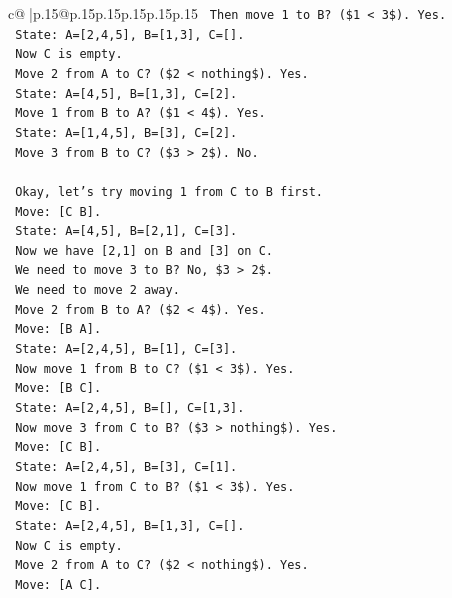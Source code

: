 \documentclass{article}
\begin{document}
{\begin{supertabular}{c@{$\;$}|p{.15\linewidth}@{}p{.15\linewidth}p{.15\linewidth}p{.15\linewidth}p{.15\linewidth}p{.15\linewidth}}
{{{\texttt{   Then move 1 to B? (\$1 < 3\$). Yes.} \\
\texttt{   State: A={[}2,4,5{]}, B={[}1,3{]}, C={[}{]}.} \\
\texttt{   Now C is empty.} \\
\texttt{   Move 2 from A to C? (\$2 < nothing\$). Yes.} \\
\texttt{   State: A={[}4,5{]}, B={[}1,3{]}, C={[}2{]}.} \\
\texttt{   Move 1 from B to A? (\$1 < 4\$). Yes.} \\
\texttt{   State: A={[}1,4,5{]}, B={[}3{]}, C={[}2{]}.} \\
\texttt{   Move 3 from B to C? (\$3 > 2\$). No.} \\
\\ 
\texttt{   Okay, let's try moving 1 from C to B first.} \\
\texttt{   Move: {[}C B{]}.} \\
\texttt{   State: A={[}4,5{]}, B={[}2,1{]}, C={[}3{]}.} \\
\texttt{   Now we have {[}2,1{]} on B and {[}3{]} on C.} \\
\texttt{   We need to move 3 to B? No, \$3 > 2\$.} \\
\texttt{   We need to move 2 away.} \\
\texttt{   Move 2 from B to A? (\$2 < 4\$). Yes.} \\
\texttt{   Move: {[}B A{]}.} \\
\texttt{   State: A={[}2,4,5{]}, B={[}1{]}, C={[}3{]}.} \\
\texttt{   Now move 1 from B to C? (\$1 < 3\$). Yes.} \\
\texttt{   Move: {[}B C{]}.} \\
\texttt{   State: A={[}2,4,5{]}, B={[}{]}, C={[}1,3{]}.} \\
\texttt{   Now move 3 from C to B? (\$3 > nothing\$). Yes.} \\
\texttt{   Move: {[}C B{]}.} \\
\texttt{   State: A={[}2,4,5{]}, B={[}3{]}, C={[}1{]}.} \\
\texttt{   Now move 1 from C to B? (\$1 < 3\$). Yes.} \\
\texttt{   Move: {[}C B{]}.} \\
\texttt{   State: A={[}2,4,5{]}, B={[}1,3{]}, C={[}{]}.} \\
\texttt{   Now C is empty.} \\
\texttt{   Move 2 from A to C? (\$2 < nothing\$). Yes.} \\
\texttt{   Move: {[}A C{]}.} \\
}}}
\end{supertabular}}
\end{document}
